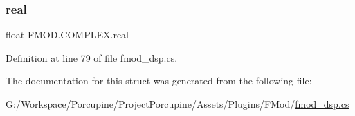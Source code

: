 \subsubsection{\texorpdfstring{real}{real}}
{\footnotesize\ttfamily float F\+M\+O\+D.\+C\+O\+M\+P\+L\+E\+X.\+real}



Definition at line 79 of file fmod\+\_\+dsp.\+cs.



The documentation for this struct was generated from the following file\+:\begin{DoxyCompactItemize}
\item 
G\+:/\+Workspace/\+Porcupine/\+Project\+Porcupine/\+Assets/\+Plugins/\+F\+Mod/\hyperlink{fmod__dsp_8cs}{fmod\+\_\+dsp.\+cs}\end{DoxyCompactItemize}
